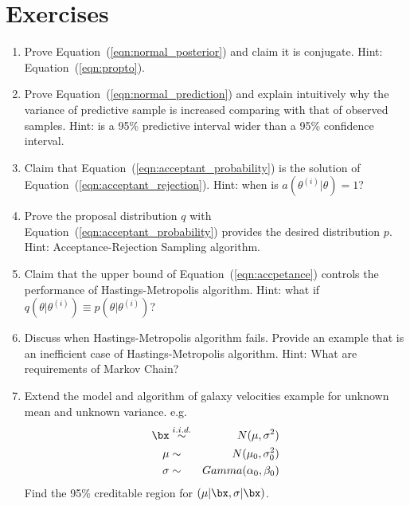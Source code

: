 \section{Exercises}
\label{sec:bayes_exercise}

\begin{enumerate}[label=\thechapter-\arabic*]

\item
Prove Equation~(\ref{eqn:normal_posterior}) and claim it is conjugate.
{\color{blue} Hint: Equation~(\ref{eqn:propto}). }

\item
Prove Equation~(\ref{eqn:normal_prediction}) and explain intuitively why
the variance of predictive sample is increased comparing with that of
observed samples.
{\color{blue} Hint: is a 95\% predictive interval wider than a 95\% confidence
interval. }

\item
Claim that Equation~(\ref{eqn:acceptant_probability}) is the solution of
Equation~(\ref{eqn:acceptant_rejection}).
{\color{blue} Hint: when is $a(\theta^{(i)} | \theta) = 1$? }

\item
Prove the proposal distribution $q$ with
Equation~(\ref{eqn:acceptant_probability}) provides the desired
distribution $p$.
{\color{blue} Hint: Acceptance-Rejection Sampling algorithm. }

\item
Claim that the upper bound of Equation~(\ref{eqn:accpetance}) controls
the performance of Hastings-Metropolis algorithm.
{\color{blue} Hint: what if
$q(\theta | \theta^{(i)}) \equiv p(\theta | \theta^{(i)})$? }

\item
Discuss when Hastings-Metropolis algorithm fails. Provide an example
that is an inefficient case of Hastings-Metropolis algorithm.
{\color{blue} Hint: What are requirements of Markov Chain? }

\item
Extend the model and algorithm of galaxy velocities example
for unknown mean and unknown variance. e.g.
\begin{eqnarray}
\bx & \stackrel{i.i.d.}{\sim} & N(\mu, \sigma^2)
  \label{eqn:normal_likelihood_un} \\
\mu & \sim & N(\mu_0, \sigma_0^2) \label{eqn:normal_prior_un_mu} \\
\sigma & \sim & Gamma(\alpha_0, \beta_0 \label{eqn:normal_prior_un_sigma} )
\end{eqnarray}
Find the 95\% creditable region for $(\mu|\bx, \sigma|\bx)$.


\end{enumerate}
